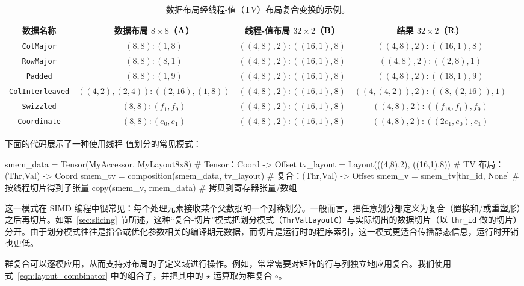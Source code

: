 \begin{table}[ht]
\centering
\begin{tabular}{|c|c|c|c|}
数据名称 & 数据布局 $8 {\times} 8$（$\mathbf{A}$） & 线程-值布局 $32 {\times} 2$（$\mathbf{B}$） & 结果 $32 {\times} 2$（$\mathbf{R}$） \\ \hline \hline
{\tt ColMajor} & $(8,8):(1,8)$ & $((4,8),2):((16,1),8)$ & $((4,8),2):((16,1),8)$ \\ \hline
{\tt RowMajor} & $(8,8):(8,1)$ & $((4,8),2):((16,1),8)$ & $((4,8),2):((2,8),1)$ \\ \hline
{\tt Padded} & $(8,8):(1,9)$ & $((4,8),2):((16,1),8)$ & $((4,8),2):((18,1),9)$ \\ \hline
{\tt ColInterleaved} & $((4,2),(2,4)):((2,16),(1,8))$ & $((4,8),2):((16,1),8)$ & $((4,(4,2)),2):((8,(2,16)),1)$ \\ \hline
{\tt Swizzled} & $(8,8):(f_1,f_9)$ & $((4,8),2):((16,1),8)$ & $((4,8),2):((f_{18},f_1),f_9)$ \\ \hline
{\tt Coordinate} & $(8,8):(e_0,e_1)$ & $((4,8),2):((16,1),8)$ & $((4,8),2):((2e_1,e_0),e_1)$ \\ \hline
\end{tabular}
\caption{数据布局经线程-值（TV）布局复合变换的示例。}
\label{tab:TVLayoutExamples}
\end{table}

下面的代码展示了一种使用线程-值划分的常见模式：
\begin{python}
smem_data = Tensor(MyAccessor, MyLayout8x8)     # Tensor：Coord -> Offset
tv_layout   = Layout(((4,8),2), ((16,1),8))     # TV 布局：(Thr,Val) -> Coord
smem_tv     = composition(smem_data, tv_layout) # 复合：(Thr,Val) -> Offset
smem_v      = smem_tv[thr_id, None]             # 按线程切片得到子张量
copy(smem_v, rmem_data)                         # 拷贝到寄存器张量/数组
\end{python}
这一模式在 SIMD 编程中很常见：每个处理元素接收某个父数据的一个对称划分。一般而言，\CuTe 把任意划分都定义为复合（置换和/或重塑形）之后再切片。如第~\ref{sec:slicing} 节所述，这种“复合-切片”模式把划分模式（{\tt ThrValLayoutC}）与实际切出的数据切片（以 {\tt thr\_id} 做的切片）分开。由于划分模式往往是指令或优化参数相关的编译期元数据，而切片是运行时的程序索引，这一模式更适合传播静态信息，运行时开销也更低。

\label{sec:tiler}

群复合可以逐模应用，从而支持对布局的子定义域进行操作。例如，常常需要对矩阵的行与列独立地应用复合。我们使用式~\eqref{eqn:layout_combinator} 中的组合子，并把其中的 $\star$ 运算取为群复合 $\circ$。

